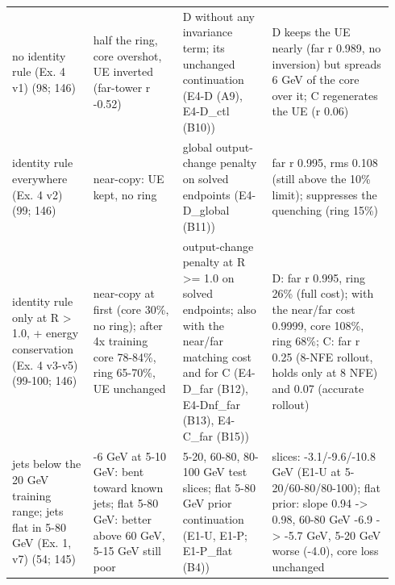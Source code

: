 \begin{tabular}{p{0.2\linewidth}p{0.22\linewidth}p{0.22\linewidth}p{0.3\linewidth}}
no identity rule (Ex. 4 v1) (98; 146) & half the ring, core overshot, UE inverted (far-tower r -0.52) & D without any invariance term; its unchanged continuation (E4-D (A9), E4-D\_ctl (B10)) & D keeps the UE nearly (far r 0.989, no inversion) but spreads 6 GeV of the core over it; C regenerates the UE (r 0.06) \\
identity rule everywhere (Ex. 4 v2) (99; 146) & near-copy: UE kept, no ring & global output-change penalty on solved endpoints (E4-D\_global (B11)) & far r 0.995, rms 0.108 (still above the 10\% limit); suppresses the quenching (ring 15\%) \\
identity rule only at R > 1.0, + energy conservation (Ex. 4 v3-v5) (99-100; 146) & near-copy at first (core 30\%, no ring); after 4x training core 78-84\%, ring 65-70\%, UE unchanged & output-change penalty at R >= 1.0 on solved endpoints; also with the near/far matching cost and for C (E4-D\_far (B12), E4-Dnf\_far (B13), E4-C\_far (B15)) & D: far r 0.995, ring 26\% (full cost); with the near/far cost 0.9999, core 108\%, ring 68\%; C: far r 0.25 (8-NFE rollout, holds only at 8 NFE) and 0.07 (accurate rollout) \\
jets below the 20 GeV training range; jets flat in 5-80 GeV (Ex. 1, v7) (54; 145) & -6 GeV at 5-10 GeV: bent toward known jets; flat 5-80 GeV: better above 60 GeV, 5-15 GeV still poor & 5-20, 60-80, 80-100 GeV test slices; flat 5-80 GeV prior continuation (E1-U, E1-P; E1-P\_flat (B4)) & slices: -3.1/-9.6/-10.8 GeV (E1-U at 5-20/60-80/80-100); flat prior: slope 0.94 -> 0.98, 60-80 GeV -6.9 -> -5.7 GeV, 5-20 GeV worse (-4.0), core loss unchanged \\
\bottomrule
\end{tabular}
